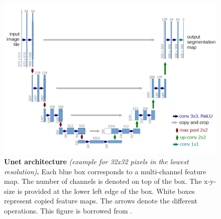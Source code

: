 \begin{figure}
\centerline{
\includegraphics[width=\textwidth]{figures/130_methods/unet_nocaption.pdf}
}
\caption{\textbf{Unet architecture} \textit{(example for 32x32 pixels in the lowest resolution)}\textbf{.}
    Each blue box corresponds to a multi-channel feature map. The number of channels is denoted on top of the box. The x-y-size is provided at the lower left edge of the box. White
    boxes represent copied feature maps. The arrows denote the different operations.
    This figure is borrowed from \protect {}.
} \label{fig:unet_architecture}
\end{figure}